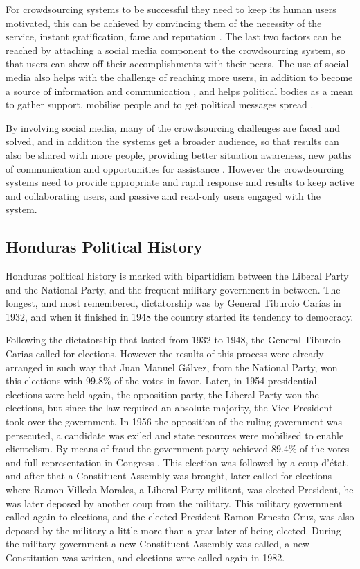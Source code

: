\documentclass[letterpaper,10pt]{article}
\begin{document}
For crowdsourcing systems to be successful they need to keep its human users motivated, this can be achieved by convincing them of the necessity of the service, instant gratification, fame and reputation \citep{doan2011}. The last two factors can be reached by attaching a social media component to the crowdsourcing system, so that users can show off their accomplishments with their peers. The use of social media also helps with the challenge of reaching more users, in addition to become a source of information and communication \citep{yin2012}, and helps political bodies as a mean to gather support, mobilise people and to get political messages spread \citep{map2014}.

By involving social media, many of the crowdsourcing challenges are faced and solved, and in addition the systems get a broader audience, so that results can also be shared with more people, providing better situation awareness, new paths of communication and opportunities for assistance \citep{gao2011}. However the crowdsourcing systems need to provide appropriate and rapid response and results to keep active and collaborating users, and passive and read-only users engaged with the system.


\subsection{Honduras Political History}

Honduras political history is marked with bipartidism between the Liberal Party and the National Party, and the frequent military government in between. The longest, and most remembered, dictatorship was by General Tiburcio Carías in 1932, and when it finished in 1948 the country started its tendency to democracy.

Following the dictatorship that lasted from 1932 to 1948, the General Tiburcio Carias called for elections. However the results of this process were already arranged in such way that Juan Manuel Gálvez, from the National Party, won this elections with 99.8\% of the votes in favor. Later, in 1954 presidential elections were held again, the opposition party, the Liberal Party won the elections, but since the law required an absolute majority, the Vice President took over the government. In 1956 the opposition of the ruling government was persecuted, a candidate was exiled and state resources were mobilised to enable clientelism. By means of fraud the government party achieved 89.4\% of the votes and full representation in Congress \citep{romero2014}. This election was followed by a coup d'\'{e}tat, and after that a Constituent Assembly was brought, later called for elections where Ramon Villeda Morales, a Liberal Party militant, was elected President, he was later deposed by another coup from the military. This military government called again to elections, and the elected President Ramon Ernesto Cruz, was also deposed by the military a little more than a year later of being elected. During the military government a new Constituent Assembly was called, a new Constitution was written, and elections were called again in 1982.
\end{document}
